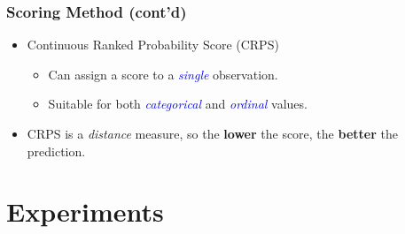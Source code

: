 \documentclass[t]{beamer}
\begin{document}
\begin{frame}\frametitle{Scoring Method \small{(cont'd)}}
\begin{itemize}
\item<1-> Continuous Ranked Probability Score (CRPS)
\begin{itemize}
\item<1-> Can assign a score to a \textcolor{blue}{\emph{single}} observation.
\item<1-> Suitable for both \textcolor{blue}{\emph{categorical}} and \textcolor{blue}{\emph{ordinal}} values.
\end{itemize}
\item<2-> CRPS is a \emph{distance} measure, so the \textbf{lower} the score, the \textbf{better} the prediction.
\end{itemize}
\end{frame}

\section{Experiments}
\end{document}
